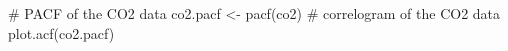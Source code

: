 \begin{Schunk}
\begin{Sinput}
 # PACF of the CO2 data
 co2.pacf <- pacf(co2)
 # correlogram of the CO2 data
 plot.acf(co2.pacf)
\end{Sinput}
\end{Schunk}
